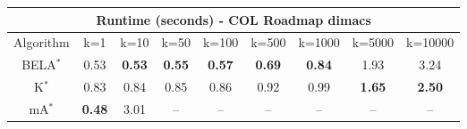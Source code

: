 \begin{tabular}{c|cccccccc}\toprule
\multicolumn{9}{c}{Runtime (seconds) - COL Roadmap dimacs}\\ \midrule
Algorithm & k=1 & k=10 & k=50 & k=100 & k=500 & k=1000 & k=5000 & k=10000 \\ \midrule
BELA$^*$ & 0.53 & \textbf{0.53} & \textbf{0.55} & \textbf{0.57} & \textbf{0.69} & \textbf{0.84} & 1.93 & 3.24 \\
K$^*$ & 0.83 & 0.84 & 0.85 & 0.86 & 0.92 & 0.99 & \textbf{1.65} & \textbf{2.50} \\
mA$^*$ & \textbf{0.48} & 3.01 & -- & -- & -- & -- & -- & -- \\ \bottomrule 
\end{tabular}
